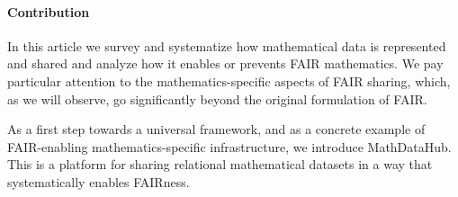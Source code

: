 \paragraph{Contribution}
In this article we survey and systematize how mathematical data is represented and shared and analyze how it enables or prevents FAIR mathematics.
We pay particular attention to the mathematics-specific aspects of FAIR sharing, which, as we will observe, go significantly beyond the original formulation of FAIR.

As a first step towards a universal framework, and as a concrete example of FAIR-enabling mathematics-specific infrastructure, we introduce MathDataHub.
This is a platform for sharing relational mathematical datasets in a way that systematically enables FAIRness.

